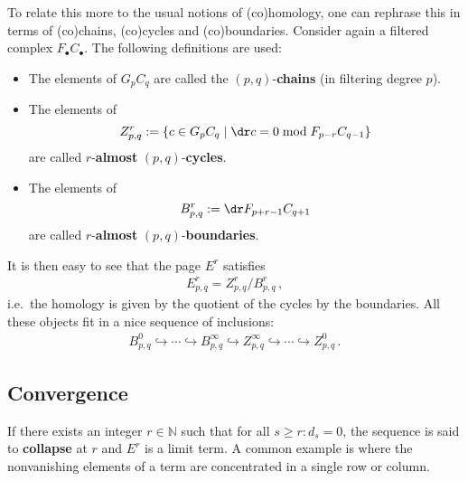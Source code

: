     To relate this more to the usual notions of (co)homology, one can rephrase this in terms of (co)chains, (co)cycles and (co)boundaries. Consider again a filtered complex $F_\bullet C_\bullet$. The following definitions are used:
    \begin{itemize}
        \item The elements of $G_pC_q$ are called the $(p,q)$-\textbf{chains} (in filtering degree $p$).
        \item The elements of \[Z^r_{p,q} := \{c\in G_pC_q\mid\dr c=0\bmod F_{p-r}C_{q-1}\}\] are called $r$-\textbf{almost} $(p,q)$-\textbf{cycles}.
        \item The elements of \[B^r_{p,q} := \dr F_{p+r-1}C_{q+1}\] are called $r$-\textbf{almost} $(p,q)$-\textbf{boundaries}.
    \end{itemize}
    It is then easy to see that the page $E^r$ satisfies
    \begin{gather}
        E^r_{p,q} = Z^r_{p,q}/B^r_{p,q}\,,
    \end{gather}
    i.e.~the homology is given by the quotient of the cycles by the boundaries. All these objects fit in a nice sequence of inclusions:
    \begin{gather}
        B^0_{p,q}\hookrightarrow\cdots\hookrightarrow B^\infty_{p,q}\hookrightarrow Z^\infty_{p,q}\hookrightarrow\cdots\hookrightarrow Z^0_{p,q}\,.
    \end{gather}

\subsection{Convergence}

    \begin{example}
        If there exists an integer $r\in\mathbb{N}$ such that for all $s\geq r:d_s=0$, the sequence is said to \textbf{collapse} at $r$ and $E^r$ is a limit term. A common example is where the nonvanishing elements of a term are concentrated in a single row or column.
    \end{example}

